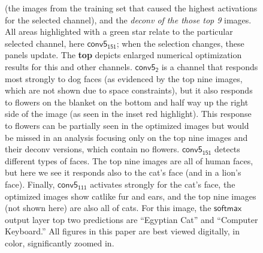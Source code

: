 \documentclass{article}
\newcommand{\layer}[1]{\ensuremath{\mathsf{#1}\xspace}}
\newcommand{\unit}[2]{\ensuremath{\mathsf{#1_{#2}}\xspace}}
\begin{document}
\begin{figure}[!th]
\begin{center}
{  (the images from the training set that caused the highest activations for the selected channel),
  and the \emph{deconv of the those top 9} images. All areas highlighted with a green star relate to the particular selected channel, here \unit{conv5}{151}; when the selection changes, these panels update.
The \textbf{top} depicts enlarged numerical optimization results for this and other channels. \unit{conv5}{2} is a channel that responds most strongly to dog faces (as evidenced by the top nine images, which are not shown due to space constraints), but it also responds to flowers on the blanket on the bottom and half way up the right side of the image (as seen in the inset red highlight). This response to flowers can be partially seen in the optimized images but would be missed in an analysis focusing only on the top nine images and their deconv versions, which contain no flowers.
\unit{conv5}{151} detects different types of faces. The top nine images are all of human faces, but here we see it responds also to the cat's face (and in  a lion's face). Finally, \unit{conv5}{111} activates strongly for the cat's face, the optimized images show catlike fur and ears, and the top nine images (not shown here) are also all of cats. For this image, the \layer{softmax} output layer top two predictions are ``Egyptian Cat'' and ``Computer Keyboard.'' All figures in this paper are best viewed digitally, in color, significantly zoomed in.
}
\end{center}
\vskip -0.2in
\end{figure}
\end{document}
